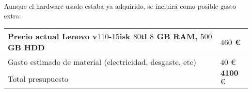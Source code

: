\hfill \break
Aunque el hardware usado estaba ya adquirido, se incluirá como posible gasto extra:\\

\begin{tabular}{| p{10cm} | p{1cm} |}
\hline
Precio actual Lenovo v$110$-$15$isk $80$tl $8$ GB RAM, $500$ GB HDD& $460$ €\\
\hline
Gasto estimado de material (electricidad, desgaste, etc) & $40$ €\\
\hline
Total presupuesto & $\boldsymbol{4100}$ €\\
\hline
\end{tabular}

\endinput
